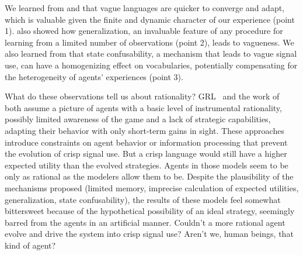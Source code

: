 \documentclass[a4paper]{article}
\begin{document}
We learned from \citeauthor{oconnor_evolution_2014} and \citeauthor{franke_vagueness_2017} that vague languages are quicker to converge and adapt, which is valuable given the finite and dynamic character of our experience (point 1).
\citeauthor{oconnor_evolving_2015} also showed how generalization, an invaluable feature of any procedure for learning from a limited number of observations (point 2), leads to vagueness.
We also learned from \citeauthor{franke_vagueness_2017} that state confusability, a mechanism that leads to vague signal use, can have a homogenizing effect on vocabularies, potentially compensating for the heterogeneity of agents' experiences (point 3).

What do these observations tell us about rationality?
GRL~\parencite{oconnor_evolution_2014} and the work of~\textcite{franke_vagueness_2017} both assume a picture of agents with a basic level of instrumental rationality, possibly limited awareness of the game and a lack of strategic capabilities, adapting their behavior with only short-term gains in sight.
These approaches introduce constraints on agent behavior or information processing that prevent the evolution of crisp signal use.
But a crisp language would still have a higher expected utility than the evolved strategies.
Agents in those models seem to be only as rational as the modelers allow them to be.
Despite the plausibility of the mechanisms proposed (limited memory, imprecise calculation of expected utilities, generalization, state confusability), the results of these models feel somewhat bittersweet because of the hypothetical possibility of an ideal strategy, seemingly barred from the agents in an artificial manner.
Couldn't a more rational agent evolve and drive the system into crisp signal use?
Aren't we, human beings, that kind of agent?
\end{document}
